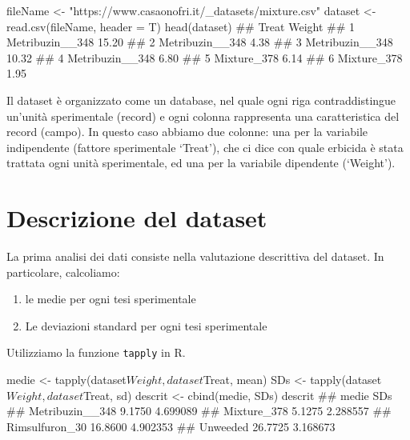 \documentclass[a4paper,12pt,oneside]{book}
\providecommand{\tightlist}{%
  \setlength{\itemsep}{0pt}\setlength{\parskip}{0pt}}
\newenvironment{Shaded}{\begin{snugshade}}{\end{snugshade}}
\newcommand{\SpecialCharTok}[1]{#1}
\newcommand{\StringTok}[1]{#1}
\newcommand{\DocumentationTok}[1]{#1}
\newcommand{\OtherTok}[1]{#1}
\newcommand{\FunctionTok}[1]{#1}
\newcommand{\AttributeTok}[1]{#1}
\newcommand{\NormalTok}[1]{#1}
\begin{document}
\begin{Shaded}
\begin{Highlighting}[]
\NormalTok{fileName }\OtherTok{\textless{}{-}} \StringTok{"https://www.casaonofri.it/\_datasets/mixture.csv"}
\NormalTok{dataset }\OtherTok{\textless{}{-}} \FunctionTok{read.csv}\NormalTok{(fileName, }\AttributeTok{header =}\NormalTok{ T)}
\FunctionTok{head}\NormalTok{(dataset)}
\DocumentationTok{\#\#             Treat Weight}
\DocumentationTok{\#\# 1 Metribuzin\_\_348  15.20}
\DocumentationTok{\#\# 2 Metribuzin\_\_348   4.38}
\DocumentationTok{\#\# 3 Metribuzin\_\_348  10.32}
\DocumentationTok{\#\# 4 Metribuzin\_\_348   6.80}
\DocumentationTok{\#\# 5     Mixture\_378   6.14}
\DocumentationTok{\#\# 6     Mixture\_378   1.95}
\end{Highlighting}
\end{Shaded}

Il dataset è organizzato come un database, nel quale ogni riga contraddistingue un'unità sperimentale (record) e ogni colonna rappresenta una caratteristica del record (campo). In questo caso abbiamo due colonne: una per la variabile indipendente (fattore sperimentale `Treat'), che ci dice con quale erbicida è stata trattata ogni unità sperimentale, ed una per la variabile dipendente (`Weight').

\hypertarget{descrizione-del-dataset}{%
\section{Descrizione del dataset}\label{descrizione-del-dataset}}

La prima analisi dei dati consiste nella valutazione descrittiva del dataset. In particolare, calcoliamo:

\begin{enumerate}
\def\labelenumi{\arabic{enumi}.}
\tightlist
\item
  le medie per ogni tesi sperimentale
\item
  Le deviazioni standard per ogni tesi sperimentale
\end{enumerate}

Utilizziamo la funzione \texttt{tapply} in R.

\begin{Shaded}
\begin{Highlighting}[]
\NormalTok{medie }\OtherTok{\textless{}{-}} \FunctionTok{tapply}\NormalTok{(dataset}\SpecialCharTok{$}\NormalTok{Weight, dataset}\SpecialCharTok{$}\NormalTok{Treat, mean)}
\NormalTok{SDs }\OtherTok{\textless{}{-}} \FunctionTok{tapply}\NormalTok{(dataset}\SpecialCharTok{$}\NormalTok{Weight, dataset}\SpecialCharTok{$}\NormalTok{Treat, sd)}
\NormalTok{descrit }\OtherTok{\textless{}{-}} \FunctionTok{cbind}\NormalTok{(medie, SDs)}
\NormalTok{descrit}
\DocumentationTok{\#\#                   medie      SDs}
\DocumentationTok{\#\# Metribuzin\_\_348  9.1750 4.699089}
\DocumentationTok{\#\# Mixture\_378      5.1275 2.288557}
\DocumentationTok{\#\# Rimsulfuron\_30  16.8600 4.902353}
\DocumentationTok{\#\# Unweeded        26.7725 3.168673}
\end{Highlighting}
\end{Shaded}
\end{document}
